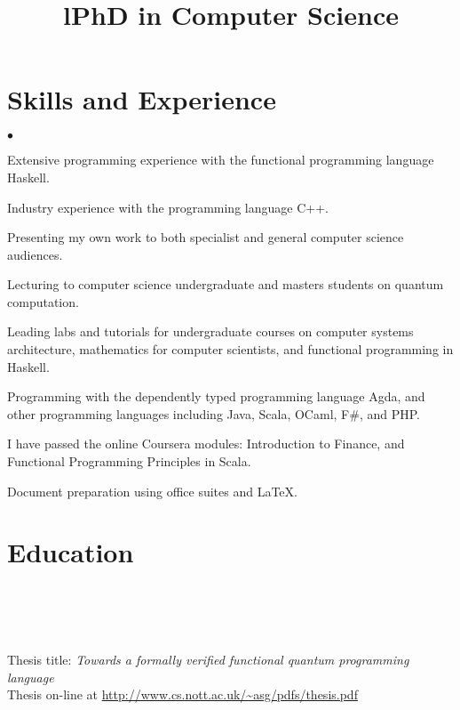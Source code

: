 \documentclass[line]{res}
\newenvironment{list2}{
  \begin{list}{$\bullet$}{%
      \setlength{\itemsep}{0in}
      \setlength{\parsep}{0.045in} \setlength{\parskip}{0in}
      \setlength{\topsep}{0in} \setlength{\partopsep}{0in}
      \setlength{\leftmargin}{0.2in}}}{\end{list}}
\begin{document}
\begin{resume}
\vspace{-4mm}
\section{\sc Skills and Experience}
\begin{list2}
\item Extensive programming experience with the functional programming
  language Haskell.
\item Industry experience with the programming language C++.
\item Presenting my own work to both specialist and general computer
  science audiences.
\item Lecturing to computer science undergraduate and masters students
  on quantum computation. 
\item Leading labs and tutorials for undergraduate courses on computer
  systems architecture, mathematics for computer scientists, and
  functional programming in Haskell.
\item Programming with the dependently typed programming language
  Agda, and other programming languages including Java, Scala, OCaml, 
  F\#, and PHP.
\item I have passed the online Coursera modules: Introduction to
  Finance, and Functional Programming Principles in Scala.
\item Document preparation using office suites and LaTeX.
\end{list2}

\vspace{-4mm}
\section{\sc Education}
\begin{format}
\title{l}\\
\\
\body\\
\end{format}

 \location{}
\title{\bf{PhD in Computer Science}}
\begin{position}
Thesis title: 
{\em Towards a formally verified functional quantum programming
  language}\\
Thesis on-line at
 \url{http://www.cs.nott.ac.uk/~asg/pdfs/thesis.pdf}\\
\vspace{-4mm}


\end{position}
\end{resume}
\end{document}
